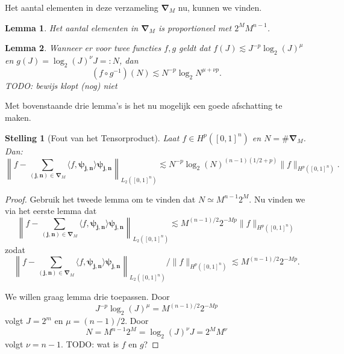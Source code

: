 \documentclass[11pt]{amsart}
\newtheorem*{lemma}{Lemma}
\newtheorem*{stelling}{Stelling}
\begin{document}
Het aantal elementen in deze verzameling $\boldsymbol{\nabla}_M$ nu, kunnen we vinden.
\begin{lemma}{\cite[L3.3.1]{tammo}}
  Het aantal elementen in $\boldsymbol{\nabla}_M$ is proportioneel met $2^M M^{n-1}$.
\end{lemma}

\begin{lemma}
  Wanneer er voor twee functies $f, g$ geldt dat $f(J) \lesssim J^{-p}\log_2(J)^\mu$ en $g(J) = \log_2(J)^\nu J =: N$, dan
  \[
    (f \circ g^{-1})(N) \lesssim N^{-p} \log_2{N}^{\mu + \nu p}.
  \]
  TODO: bewijs klopt (nog) niet
\end{lemma}
\iffalse
\begin{proof}[Bewijs]
  We weten dat $g(J) = N$ dus $g^{-1}(N) = J$. Dan
  \[
    (f \circ g^{-1})(N) = f(J) \simeq J^{-p}\log_2(J)^{\mu}.
  \]
  Omdat verder $J \log_2(J)^\nu = N$, geldt $J^{-1} = N^{-1}\log_2(J)^\nu$. Vul dit in in bovenstaande om te krijgen
  \[
    f(J) \simeq N^{-s} \log_2(J)^{\nu s} \log_2(J)^\mu = N^{-s} \log_2(J)^{\nu s + \mu}????
  \]
\end{proof}
\fi

Met bovenstaande drie lemma's is het nu mogelijk een goede afschatting te maken. 
\begin{stelling}[Fout van het Tensorproduct]
  Laat $f \in H^p([0,1]^n)$ en $N = \#\boldsymbol{\nabla}_M$. Dan:
  \[
    \left\| f - \sum_{\boldsymbol{(j,n)} \in \boldsymbol{\nabla}_M} \langle f, \boldsymbol{\psi_{j,n}} \rangle \boldsymbol{\psi_{j,n}} \right\|_{L_2([0,1]^n)} \lesssim N^{-p} \log_2(N)^{(n-1)(1/2 + p)} \| f \|_{H^p([0,1]^n)}.
  \]
\end{stelling}
\begin{proof}
  Gebruik het tweede lemma om te vinden dat $N \simeq M^{n-1}2^M$. Nu vinden we via het eerste lemma dat
  \[
    \left\| f - \sum_{\boldsymbol{(j,n)} \in \boldsymbol{\nabla}_M} \langle f, \boldsymbol{\psi_{j,n}} \rangle \boldsymbol{\psi_{j,n}} \right\|_{L_2([0,1]^n)} \lesssim M^{(n-1)/2}2^{-Mp}\| f \|_{H^p([0,1]^n)}
  \]
  zodat
  \[
    \left\| f - \sum_{\boldsymbol{(j,n)} \in \boldsymbol{\nabla}_M} \langle f, \boldsymbol{\psi_{j,n}} \rangle \boldsymbol{\psi_{j,n}} \right\|_{L_2([0,1]^n)} \Bigg/\| f \|_{H^p([0,1]^n)} \lesssim M^{(n-1)/2}2^{-Mp}.
  \]

  We willen graag lemma drie toepassen. Door
  \[
    J^{-p}\log_2(J)^\mu = M^{(n-1)/2} 2^{-Mp}
  \]
  volgt $J = 2^m$ en $\mu = (n-1)/2$. Door
  \[
    N = M^{n-1}2^M = \log_2(J)^\nu J = 2^M M^\nu
  \] volgt $\nu = n-1$. TODO: wat is $f$ en $g$?
\end{proof}
\end{document}
